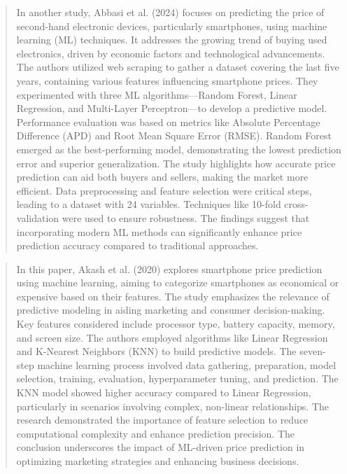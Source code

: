 \documentclass[12pt]{report}
\begin{document}
\begin{quotation}
  In another study, Abbasi et al. \cite{abbasi2024} (2024) focuses on predicting the price of second-hand electronic devices, particularly smartphones, using machine learning (ML) techniques. It addresses the growing trend of buying used electronics, driven by economic factors and technological advancements. The authors utilized web scraping to gather a dataset covering the last five years, containing various features influencing smartphone prices. They experimented with three ML algorithms—Random Forest, Linear Regression, and Multi-Layer Perceptron—to develop a predictive model. Performance evaluation was based on metrics like Absolute Percentage Difference (APD) and Root Mean Square Error (RMSE). Random Forest emerged as the best-performing model, demonstrating the lowest prediction error and superior generalization. The study highlights how accurate price prediction can aid both buyers and sellers, making the market more efficient. Data preprocessing and feature selection were critical steps, leading to a dataset with 24 variables. Techniques like 10-fold cross-validation were used to ensure robustness. The findings suggest that incorporating modern ML methods can significantly enhance price prediction accuracy compared to traditional approaches.
\end{quotation}

\begin{quotation}
  In this paper, Akash et al. \cite{gupta2020} (2020) explores smartphone price prediction using machine learning, aiming to categorize smartphones as economical or expensive based on their features. The study emphasizes the relevance of predictive modeling in aiding marketing and consumer decision-making. Key features considered include processor type, battery capacity, memory, and screen size. The authors employed algorithms like Linear Regression and K-Nearest Neighbors (KNN) to build predictive models. The seven-step machine learning process involved data gathering, preparation, model selection, training, evaluation, hyperparameter tuning, and prediction. The KNN model showed higher accuracy compared to Linear Regression, particularly in scenarios involving complex, non-linear relationships. The research demonstrated the importance of feature selection to reduce computational complexity and enhance prediction precision. The conclusion underscores the impact of ML-driven price prediction in optimizing marketing strategies and enhancing business decisions.
\end{quotation}
\end{document}

